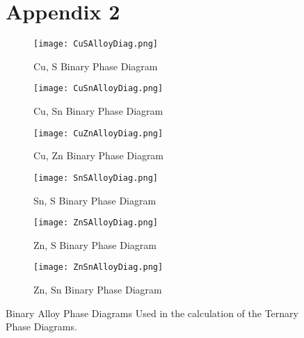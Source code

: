 \begin{figure}[t]
\chapter{Appendix 2}
\centering
\begin{subfigure}{70mm}
  \centering
    \texttt{[image: CuSAlloyDiag.png]}
    \caption{Cu, S Binary Phase Diagram\citep{asm_international_asm_1992}}
    \label{fig:CuS}
\end{subfigure}%
\begin{subfigure}{70mm}
 \centering
    \texttt{[image: CuSnAlloyDiag.png]}
    \caption{Cu, Sn Binary Phase Diagram\citep{asm_international_asm_1992}}
    \label{fig:CuSn}
\end{subfigure}
\begin{subfigure}{70mm}
 \centering
    \texttt{[image: CuZnAlloyDiag.png]}
    \caption{Cu, Zn Binary Phase Diagram\citep{asm_international_asm_1992}}
    \label{fig:CuZn}
\end{subfigure}
\begin{subfigure}{70mm}
 \centering
    \texttt{[image: SnSAlloyDiag.png]}
    \caption{Sn, S Binary Phase Diagram\citep{asm_international_asm_1992}}
    \label{fig:SnS}
\end{subfigure}
\begin{subfigure}{70mm}
 \centering
    \texttt{[image: ZnSAlloyDiag.png]}
    \caption{Zn, S Binary Phase Diagram\citep{sharma_s-zn_1996}}
    \label{fig:ZnS}
\end{subfigure}
\begin{subfigure}{70mm}
 \centering
    \texttt{[image: ZnSnAlloyDiag.png]}
    \caption{Zn, Sn Binary Phase Diagram\citep{asm_international_asm_1992}}
    \label{fig:ZnSn}
\end{subfigure}
\caption{Binary Alloy Phase Diagrams Used in the calculation of the Ternary Phase Diagrams.}
\label{fig:BinaryAlloyPhaseDiagrams}
\end{figure}